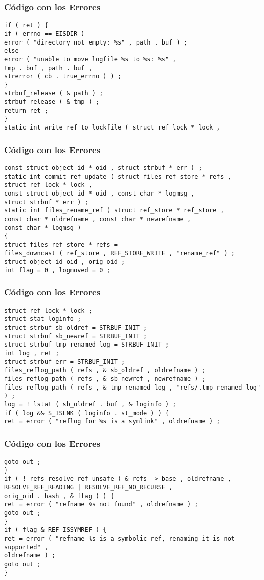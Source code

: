 \documentclass{beamer}
\begin{document}
\begin{frame}[fragile]
\frametitle{C\'odigo con los Errores}
\begin{verbatim}
if ( ret ) { 
if ( errno == EISDIR ) 
error ( "directory not empty: %s" , path . buf ) ; 
else 
error ( "unable to move logfile %s to %s: %s" , 
tmp . buf , path . buf , 
strerror ( cb . true_errno ) ) ; 
} 
strbuf_release ( & path ) ; 
strbuf_release ( & tmp ) ; 
return ret ; 
} 
static int write_ref_to_lockfile ( struct ref_lock * lock , 
\end{verbatim}
\end{frame}
\begin{frame}[fragile]
\frametitle{C\'odigo con los Errores}
\begin{verbatim}
const struct object_id * oid , struct strbuf * err ) ; 
static int commit_ref_update ( struct files_ref_store * refs , 
struct ref_lock * lock , 
const struct object_id * oid , const char * logmsg , 
struct strbuf * err ) ; 
static int files_rename_ref ( struct ref_store * ref_store , 
const char * oldrefname , const char * newrefname , 
const char * logmsg ) 
{ 
struct files_ref_store * refs = 
files_downcast ( ref_store , REF_STORE_WRITE , "rename_ref" ) ; 
struct object_id oid , orig_oid ; 
int flag = 0 , logmoved = 0 ; 
\end{verbatim}
\end{frame}
\begin{frame}[fragile]
\frametitle{C\'odigo con los Errores}
\begin{verbatim}
struct ref_lock * lock ; 
struct stat loginfo ; 
struct strbuf sb_oldref = STRBUF_INIT ; 
struct strbuf sb_newref = STRBUF_INIT ; 
struct strbuf tmp_renamed_log = STRBUF_INIT ; 
int log , ret ; 
struct strbuf err = STRBUF_INIT ; 
files_reflog_path ( refs , & sb_oldref , oldrefname ) ; 
files_reflog_path ( refs , & sb_newref , newrefname ) ; 
files_reflog_path ( refs , & tmp_renamed_log , "refs/.tmp-renamed-log" ) ; 
log = ! lstat ( sb_oldref . buf , & loginfo ) ; 
if ( log && S_ISLNK ( loginfo . st_mode ) ) { 
ret = error ( "reflog for %s is a symlink" , oldrefname ) ; 
\end{verbatim}
\end{frame}
\begin{frame}[fragile]
\frametitle{C\'odigo con los Errores}
\begin{verbatim}
goto out ; 
} 
if ( ! refs_resolve_ref_unsafe ( & refs -> base , oldrefname , 
RESOLVE_REF_READING | RESOLVE_REF_NO_RECURSE , 
orig_oid . hash , & flag ) ) { 
ret = error ( "refname %s not found" , oldrefname ) ; 
goto out ; 
} 
if ( flag & REF_ISSYMREF ) { 
ret = error ( "refname %s is a symbolic ref, renaming it is not supported" , 
oldrefname ) ; 
goto out ; 
} 
\end{verbatim}
\end{frame}
\end{document}
